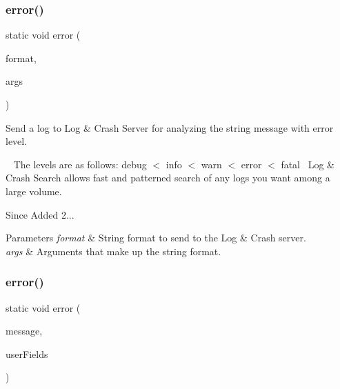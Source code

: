 \subsubsection{\texorpdfstring{error()}{error()}\hspace{0.1cm}{\footnotesize\ttfamily [2/3]}}
{\footnotesize\ttfamily static void error (\begin{DoxyParamCaption}\item[{@Non\+Null final String}]{format,  }\item[{@Non\+Null final Object...}]{args }\end{DoxyParamCaption})\hspace{0.3cm}{\ttfamily [static]}}



Send a log to Log \& Crash Server for analyzing the string message with error level. 

~\newline
 The levels are as follows\+: debug $<$ info $<$ warn $<$ error $<$ fatal~\newline
 Log \& Crash Search allows fast and patterned search of any logs you want among a large volume.

\begin{DoxySince}{Since}
Added 2... 
\end{DoxySince}

\begin{DoxyParams}{Parameters}
{\em format} & String format to send to the Log \& Crash server. \\
\hline
{\em args} & Arguments that make up the string format. \\
\hline
\end{DoxyParams}
\mbox{\label{classcom_1_1toast_1_1android_1_1gamebase_1_1_gamebase_1_1_logger_aee5a963d79bf05d430aa6c79d9055627}} 
\subsubsection{\texorpdfstring{error()}{error()}\hspace{0.1cm}{\footnotesize\ttfamily [3/3]}}
{\footnotesize\ttfamily static void error (\begin{DoxyParamCaption}\item[{@Non\+Null final String}]{message,  }\item[{@Non\+Null final Map$<$ String, String $>$}]{user\+Fields }\end{DoxyParamCaption})\hspace{0.3cm}{\ttfamily [static]}}




